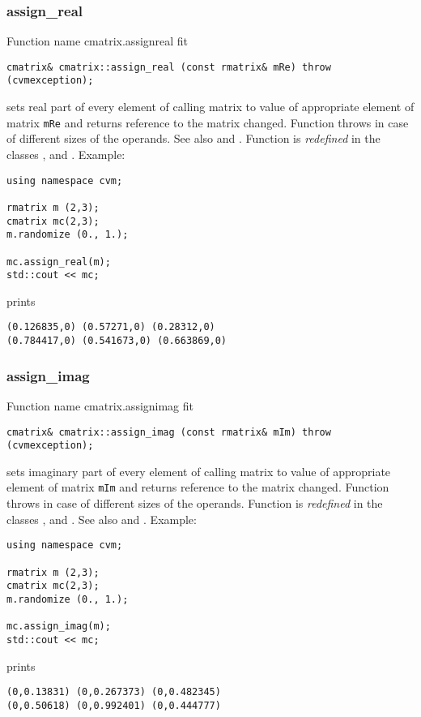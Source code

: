 \subsubsection{assign\_real}
Function%
\pdfdest name {cmatrix.assignreal} fit
\begin{verbatim}
cmatrix& cmatrix::assign_real (const rmatrix& mRe) throw (cvmexception);
\end{verbatim}
sets real part of every element of  calling matrix to  value of
appropriate element of  matrix \verb"mRe"
and returns  reference to
the matrix changed.
Function throws  
in case of different sizes of the operands.
See also  and .
Function is \emph{redefined} in the classes
,  
and .
Example:
\begin{Verbatim}
using namespace cvm;

rmatrix m (2,3);
cmatrix mc(2,3);
m.randomize (0., 1.);

mc.assign_real(m);
std::cout << mc;
\end{Verbatim}
prints
\begin{Verbatim}
(0.126835,0) (0.57271,0) (0.28312,0)
(0.784417,0) (0.541673,0) (0.663869,0)
\end{Verbatim}
\newpage




\subsubsection{assign\_imag}
Function%
\pdfdest name {cmatrix.assignimag} fit
\begin{verbatim}
cmatrix& cmatrix::assign_imag (const rmatrix& mIm) throw (cvmexception);
\end{verbatim}
sets imaginary part of every element of  calling matrix to  value of
appropriate element of  matrix \verb"mIm"
and returns  reference to
the matrix changed.
Function throws  
in case of different sizes of the operands.
Function is \emph{redefined} in the classes
,  
and .
See also  and .
Example:
\begin{Verbatim}
using namespace cvm;

rmatrix m (2,3);
cmatrix mc(2,3);
m.randomize (0., 1.);

mc.assign_imag(m);
std::cout << mc;
\end{Verbatim}
prints
\begin{Verbatim}
(0,0.13831) (0,0.267373) (0,0.482345)
(0,0.50618) (0,0.992401) (0,0.444777)
\end{Verbatim}
\newpage




